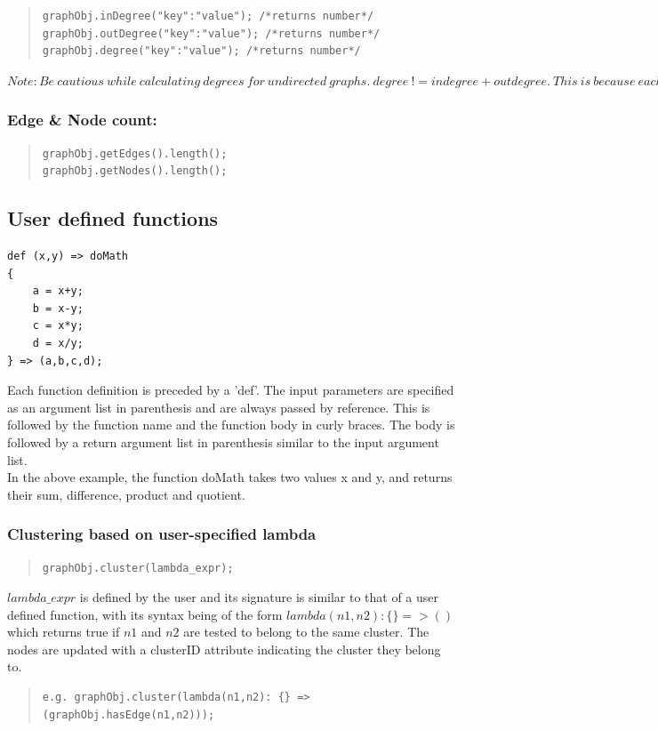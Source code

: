 \documentclass[a4paper]{article}
\begin{document}
\begin{quote}
\begin{verbatim}
graphObj.inDegree("key":"value"); /*returns number*/
graphObj.outDegree("key":"value"); /*returns number*/
graphObj.degree("key":"value"); /*returns number*/

\end{verbatim}
\end{quote}
$Note: Be\ cautious\ while\ calculating\ degrees\ for\ undirected\ graphs.\ degree\ != indegree + outdegree.\ This\ is\ because\ each\ edge\ counts\ only\ once.$

\subsubsection{Edge \& Node count:}

\begin{quote}
\begin{verbatim}
graphObj.getEdges().length();
graphObj.getNodes().length();
\end{verbatim}
\end{quote}


\subsection{User defined functions}
\begin{verbatim}
def (x,y) => doMath
{
    a = x+y;
    b = x-y;
    c = x*y;
    d = x/y;
} => (a,b,c,d);
\end{verbatim}
Each function definition is preceded by a 'def'. The input parameters are specified as an argument list in parenthesis and are always passed by reference. This is followed by the function name and the function body in curly braces. The body is followed by a return argument list in parenthesis similar to the input argument list.\\
In the above example, the function doMath takes two values x and y, and returns their sum, difference, product and quotient.

\subsubsection{Clustering based on user-specified lambda}
\begin{quote}
\begin{verbatim}
graphObj.cluster(lambda_expr);
\end{verbatim}

\end{quote}
\noindent $lambda\_expr$ is defined by the user and its signature is similar to that of a user defined function, with its syntax being of the form  $lambda(n1,n2):\{\}=>()$ which returns true if $n1$ and $n2$ are tested to belong to the same cluster. The nodes are updated with a clusterID attribute indicating the cluster they belong to.
\begin{quote}
\begin{verbatim}
e.g. graphObj.cluster(lambda(n1,n2): {} => (graphObj.hasEdge(n1,n2)));
\end{verbatim}
\end{quote}
\end{document}
